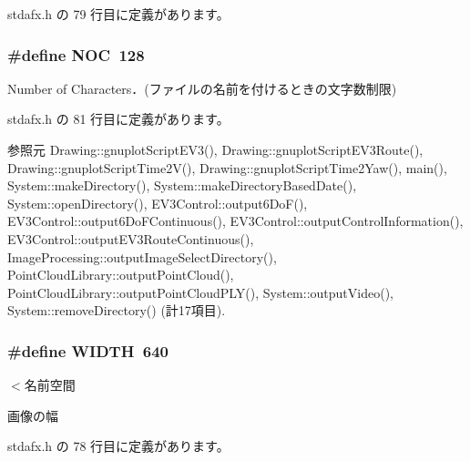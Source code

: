  stdafx.\-h の 79 行目に定義があります。

\subsubsection[{N\-O\-C}]{\setlength{\rightskip}{0pt plus 5cm}\#define N\-O\-C~128}\label{stdafx_8h_a5d8ba032e2fdf7b2561f508164124f3e}


Number of Characters．(ファイルの名前を付けるときの文字数制限) 



 stdafx.\-h の 81 行目に定義があります。



参照元 Drawing\-::gnuplot\-Script\-E\-V3(), Drawing\-::gnuplot\-Script\-E\-V3\-Route(), Drawing\-::gnuplot\-Script\-Time2\-V(), Drawing\-::gnuplot\-Script\-Time2\-Yaw(), main(), System\-::make\-Directory(), System\-::make\-Directory\-Based\-Date(), System\-::open\-Directory(), E\-V3\-Control\-::output6\-Do\-F(), E\-V3\-Control\-::output6\-Do\-F\-Continuous(), E\-V3\-Control\-::output\-Control\-Information(), E\-V3\-Control\-::output\-E\-V3\-Route\-Continuous(), Image\-Processing\-::output\-Image\-Select\-Directory(), Point\-Cloud\-Library\-::output\-Point\-Cloud(), Point\-Cloud\-Library\-::output\-Point\-Cloud\-P\-L\-Y(), System\-::output\-Video(), System\-::remove\-Directory() (計17項目).

\subsubsection[{W\-I\-D\-T\-H}]{\setlength{\rightskip}{0pt plus 5cm}\#define W\-I\-D\-T\-H~640}\label{stdafx_8h_a241aeeb764887ae5e3de58b98f04b16d}


$<$名前空間 

画像の幅 

 stdafx.\-h の 78 行目に定義があります。

